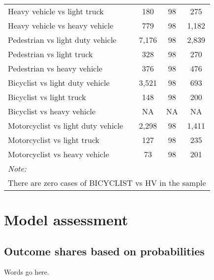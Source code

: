 \documentclass[]{elsarticle} %
\begin{document}
\begin{table}
\begin{tabular}[t]{lccc}
\hspace{1em}Heavy vehicle vs light truck & 180 & 98 & 275\\
\rowcolor{gray!6}  \hspace{1em}Heavy vehicle vs heavy vehicle & 779 & 98 & 1,182\\
\hspace{1em}Pedestrian vs light duty vehicle & 7,176 & 98 & 2,839\\
\rowcolor{gray!6}  \hspace{1em}Pedestrian vs light truck & 328 & 98 & 270\\
\hspace{1em}Pedestrian vs heavy vehicle & 376 & 98 & 476\\
\rowcolor{gray!6}  \hspace{1em}Bicyclist vs light duty vehicle & 3,521 & 98 & 693\\
\hspace{1em}Bicyclist vs light truck & 148 & 98 & 200\\
\rowcolor{gray!6}  Bicyclist vs heavy vehicle & NA & NA & \vphantom{1} NA\\
\hspace{1em}Motorcyclist vs light duty vehicle & 2,298 & 98 & 1,411\\
\rowcolor{gray!6}  \hspace{1em}Motorcyclist vs light truck & 127 & 98 & 235\\
\hspace{1em}Motorcyclist vs heavy vehicle & 73 & 98 & 201\\
\bottomrule
\multicolumn{4}{l}{\textit{Note: }}\\
\multicolumn{4}{l}{There are zero cases of BICYCLIST vs HV in the sample}\\
\end{tabular}
\end{table}

\hypertarget{sec:assessment}{%
\section{Model assessment}\label{sec:assessment}}

\hypertarget{outcome-shares-based-on-probabilities}{%
\subsection{Outcome shares based on
probabilities}\label{outcome-shares-based-on-probabilities}}

Words go here.
\end{document}
